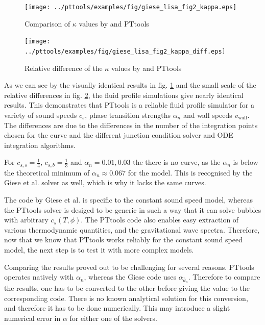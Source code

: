 \begin{figure}[ht!]
\centering
\texttt{[image: ../pttools/examples/fig/giese\_lisa\_fig2\_kappa.eps]}
\caption{Comparison of $\kappa$ values by \cite[fig. 2]{giese_2021} and PTtools}
\label{fig:kappa_giese}
\end{figure}

\begin{figure}[ht!]
\centering
\texttt{[image: ../pttools/examples/fig/giese\_lisa\_fig2\_kappa\_diff.eps]}
\caption{Relative difference of the $\kappa$ values by \cite[fig. 2]{giese_2021} and PTtools}
\label{fig:kappa_giese_diff}
\end{figure}

As we can see by the visually identical results in fig. \ref{fig:kappa_giese}
and the small scale of the relative differences in fig. \ref{fig:kappa_giese_diff},
the fluid profile simulations give nearly identical results.
This demonstrates that PTtools is a reliable fluid profile simulator for a variety of
sound speeds $c_s$, phase transition strengths $\alpha_n$ and wall speeds $v_\text{wall}$.
The differences are due to the differences in the number of the integration points chosen for the curve
and the different junction condition solver and ODE integration algorithms.

For $c_{s,s}=\frac{1}{4}$, $c_{s,b}=\frac{1}{3}$ and $\alpha_n = 0.01, 0.03$ the there is no curve,
as the $\alpha_n$ is below the theoretical minimum of $\alpha_n \approx 0.067$ for the model.
This is recognised by the Giese et al. solver as well,
which is why it lacks the same curves.

The code by Giese et al. is specific to the constant sound speed model,
whereas the PTtools solver is desiged to be generic in such a way that
it can solve bubbles with arbitrary $c_s(T,\phi)$.
The PTtools code also enables easy extraction of various thermodynamic quantities,
and the gravitational wave spectra.
Therefore, now that we know that PTtools works reliably for the constant sound speed model,
the next step is to test it with more complex models.


\iffalse
Comparing the results proved out to be challenging for several reasons.
PTtools operates natively with $\alpha_n$, whereas the Giese code uses $\alpha_{\bar{\theta}_n}$.
Therefore to compare the results, one has to be converted to the other before giving the value to the corresponding code.
There is no known analytical solution for this conversion, and therefore it has to be done numerically.
This may introduce a slight numerical error in $\alpha$ for either one of the solvers.


